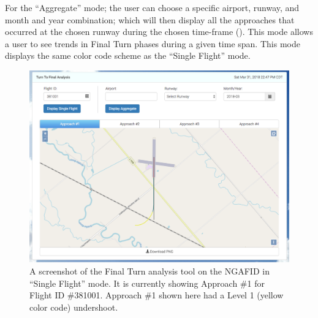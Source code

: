         For the ``Aggregate'' mode; the user can choose a specific airport, runway, and month and year combination; which will then display all the approaches that occurred at the chosen runway during the chosen time-frame ().  This mode allows a user to see trends in Final Turn phases during a given time span.  This mode displays the same color code scheme as the ``Single Flight'' mode.
    
    	\begin{figure}
    		\centering
            \includegraphics[width=\linewidth]{img/single_ttf_screenshot}
            \caption{A screenshot of the Final Turn analysis tool on the NGAFID in ``Single Flight'' mode.  It is currently showing Approach \#1 for Flight ID \#381001.  Approach \#1 shown here had a Level 1 (yellow color code) undershoot.}
            \label{fig:single_ttf_screenshot}
    	\end{figure}
        
